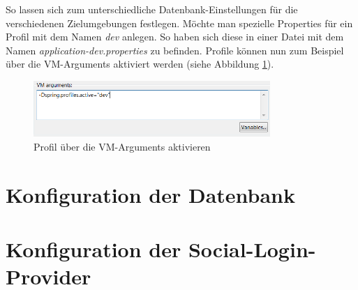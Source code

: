 So lassen sich zum unterschiedliche Datenbank-Einstellungen für die verschiedenen Zielumgebungen festlegen. Möchte man spezielle Properties für ein Profil mit dem Namen \emph{dev} anlegen. So haben sich diese in einer Datei mit dem Namen \emph{application-dev.properties} zu befinden. Profile können nun zum Beispiel über die VM-Arguments aktiviert werden (siehe Abbildung \ref{fig:active-profile}).
\begin{figure}[H]
    \centering
    \includegraphics[width=0.8\textwidth]{Bilder/startlauncher.png}
    \caption{Profil über die VM-Arguments aktivieren}
    \label{fig:active-profile}
\end{figure}

\section{Konfiguration der Datenbank}\label{s_config_db}

\section{Konfiguration der Social-Login-Provider}\label{s_config_social}